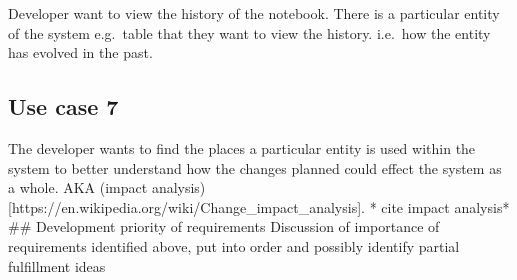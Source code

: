 Developer want to view the history of the notebook. There is a
particular entity of the system e.g.~table that they want to view the
history. i.e.~how the entity has evolved in the past.

\subsection{Use case 7}\label{use-case-7}

The developer wants to find the places a particular entity is used
within the system to better understand how the changes planned could
effect the system as a whole. AKA (impact
analysis){[}https://en.wikipedia.org/wiki/Change\_impact\_analysis{]}. *
cite impact analysis* \#\# Development priority of requirements
Discussion of importance of requirements identified above, put into
order and possibly identify partial fulfillment ideas
